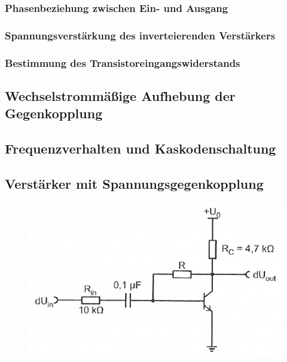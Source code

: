 \subsubsection{Phasenbeziehung zwischen Ein- und Ausgang}

\fehlt

\subsubsection{Spannungsverstärkung des inverteierenden Verstärkers}

\fehlt

\subsubsection{Bestimmung des Transistoreingangswiderstands}

\fehlt

\subsection{Wechselstrommäßige Aufhebung der Gegenkopplung}

\fehlt

\subsection{Frequenzverhalten und Kaskodenschaltung}

\fehlt

\subsection{Verstärker mit Spannungsgegenkopplung}

\fehlt

\begin{figure}[htbp]
	\centering
	\includegraphics[width=.6\textwidth]{Anleitung/4-1.png}
	\caption{
		\cite[Abbildung~4.1]{physik313-Anleitung}
	}
	\label{fig:4-1}
\end{figure}


\FloatBarrier
\IfFileExists{\bibliographyfile}{
	
}{}



